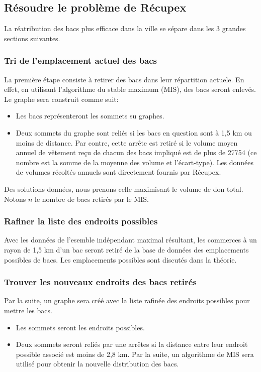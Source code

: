 \documentclass[11pt]{article}
\begin{document}
\subsection{Résoudre le problème de Récupex}
La réatribution des bacs plus efficace dans la ville se sépare dans les 3 grandes sections suivantes.

\subsubsection{Tri de l'emplacement actuel des bacs}
La première étape consiste à retirer des bacs dans leur répartition actuele. En effet, en utilisant l'algorithme du stable maximum (MIS), des bacs seront enlevés. Le graphe sera construit comme suit:
\begin{itemize}
    \item Les bacs représenteront les sommets su graphes.
    \item Deux sommets du graphe sont reliés si les bacs en question sont à 1,5 km ou moins de distance. Par contre, cette arrête est retiré si le volume moyen annuel de vêtement reçu de chacun des bacs impliqué est de plus de 27754 (ce nombre est la somme de la moyenne des volume et l'écart-type). Les données de volumes récoltés annuels sont directement fournis par Récupex.
\end{itemize}
Des solutions données, nous prenons celle maximisant le volume de don total. Notons $n$ le nombre de bacs retirés par le MIS.

\subsubsection{Rafiner la liste des endroits possibles}
Avec les données de l'esemble indépendant maximal résultant, les commerces à un rayon de 1,5 km d'un bac seront retiré de la base de données des emplacements possibles de bacs. Les emplacements possibles sont discutés dans la théorie.

\subsubsection{Trouver les nouveaux endroits des bacs retirés}
Par la suite, un graphe sera créé avec la liste rafinée des endroits possibles pour mettre les bacs.
\begin{itemize}
    \item Les sommets seront les endroits possibles.
    \item Deux sommets seront reliés par une arrêtes si la distance entre leur endroit possible associé est moins de 2,8 km. Par la suite, un algorithme de MIS sera utilisé pour obtenir la nouvelle distribution des bacs.
\end{itemize}
\end{document}
